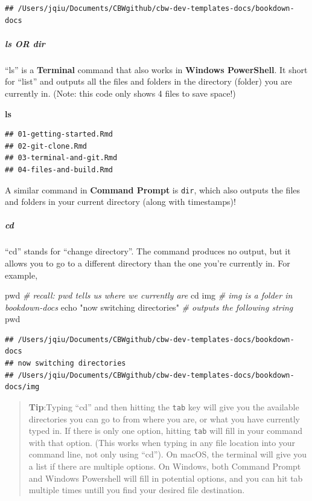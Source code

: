\documentclass[
]{book}
\newenvironment{Shaded}{\begin{snugshade}}{\end{snugshade}}
\newcommand{\BuiltInTok}[1]{#1}
\newcommand{\CommentTok}[1]{\textcolor[rgb]{0.56,0.35,0.01}{\textit{#1}}}
\newcommand{\FunctionTok}[1]{\textcolor[rgb]{0.13,0.29,0.53}{\textbf{#1}}}
\newcommand{\NormalTok}[1]{#1}
\newcommand{\StringTok}[1]{\textcolor[rgb]{0.31,0.60,0.02}{#1}}
\theoremstyle{definition}
\theoremstyle{definition}
\theoremstyle{definition}
\theoremstyle{definition}
\theoremstyle{remark}
\begin{document}
\begin{verbatim}
## /Users/jqiu/Documents/CBWgithub/cbw-dev-templates-docs/bookdown-docs
\end{verbatim}

\subparagraph*{ls OR dir}\label{ls-or-dir}

``ls'' is a \textbf{Terminal} command that also works in \textbf{Windows PowerShell}. It short for ``list'' and outputs all the files and folders in the directory (folder) you are currently in. (Note: this code only shows 4 files to save space!)

\begin{Shaded}
\begin{Highlighting}[]
\FunctionTok{ls}
\end{Highlighting}
\end{Shaded}

\begin{verbatim}
## 01-getting-started.Rmd
## 02-git-clone.Rmd
## 03-terminal-and-git.Rmd
## 04-files-and-build.Rmd
\end{verbatim}

A similar command in \textbf{Command Prompt} is \texttt{dir}, which also outputs the files and folders in your current directory (along with timestamps)!

\subparagraph*{cd}\label{cd}

``cd'' stands for ``change directory''. The command produces no output, but it allows you to go to a different directory than the one you're currently in. For example,

\begin{Shaded}
\begin{Highlighting}[]
\BuiltInTok{pwd} \CommentTok{\# recall: pwd tells us where we currently are}
\BuiltInTok{cd}\NormalTok{ img }\CommentTok{\# img is a folder in bookdown{-}docs}
\BuiltInTok{echo} \StringTok{"now switching directories"} \CommentTok{\# outputs the following string}
\BuiltInTok{pwd}
\end{Highlighting}
\end{Shaded}

\begin{verbatim}
## /Users/jqiu/Documents/CBWgithub/cbw-dev-templates-docs/bookdown-docs
## now switching directories
## /Users/jqiu/Documents/CBWgithub/cbw-dev-templates-docs/bookdown-docs/img
\end{verbatim}

\begin{quote}
\textbf{Tip}:Typing ``cd'' and then hitting the \texttt{tab} key will give you the available directories you can go to from where you are, or what you have currently typed in. If there is only one option, hitting \texttt{tab} will fill in your command with that option. (This works when typing in any file location into your command line, not only using ``cd''). On macOS, the terminal will give you a list if there are multiple options. On Windows, both Command Prompt and Windows Powershell will fill in potential options, and you can hit tab multiple times untill you find your desired file destination.
\end{quote}
\end{document}
